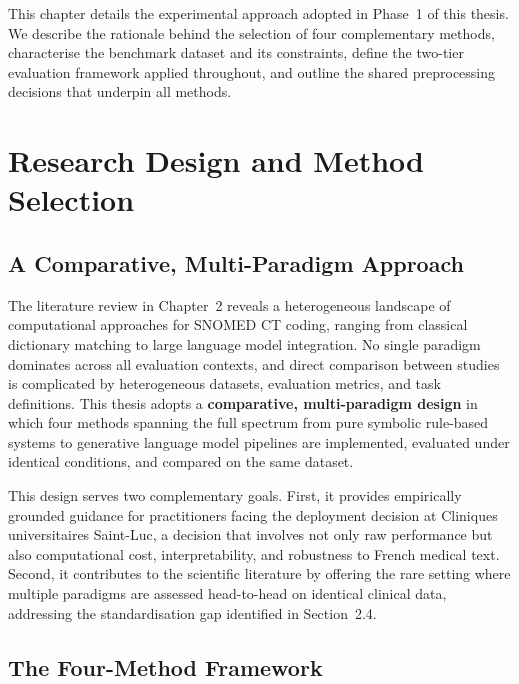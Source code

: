 
This chapter details the experimental approach adopted in Phase~1 of this thesis. We describe the rationale behind the selection of four complementary methods, characterise the benchmark dataset and its constraints, define the two-tier evaluation framework applied throughout, and outline the shared preprocessing decisions that underpin all methods.

\section{Research Design and Method Selection}

\subsection{A Comparative, Multi-Paradigm Approach}

The literature review in Chapter~2 reveals a heterogeneous landscape of computational approaches for SNOMED CT coding, ranging from classical dictionary matching to large language model integration. No single paradigm dominates across all evaluation contexts, and direct comparison between studies is complicated by heterogeneous datasets, evaluation metrics, and task definitions. This thesis adopts a \textbf{comparative, multi-paradigm design} in which four methods spanning the full spectrum from pure symbolic rule-based systems to generative language model pipelines are implemented, evaluated under identical conditions, and compared on the same dataset.

This design serves two complementary goals. First, it provides empirically grounded guidance for practitioners facing the deployment decision at Cliniques universitaires Saint-Luc, a decision that involves not only raw performance but also computational cost, interpretability, and robustness to French medical text. Second, it contributes to the scientific literature by offering the rare setting where multiple paradigms are assessed head-to-head on identical clinical data, addressing the standardisation gap identified in Section~2.4.

\subsection{The Four-Method Framework}

